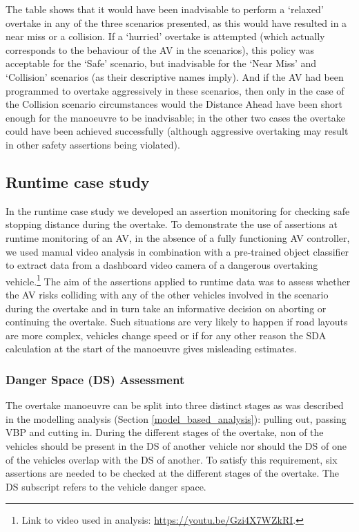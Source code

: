 The table shows that it would have been inadvisable to perform a `relaxed' overtake in any of the three scenarios presented, as this would have resulted in a near miss or a collision. If a `hurried' overtake is attempted (which actually corresponds to the behaviour of the AV in the scenarios), this policy was acceptable for the `Safe' scenario, but inadvisable for the `Near Miss' and `Collision' scenarios (as their descriptive names imply). And if the AV had been programmed to overtake aggressively in these scenarios, then only in the case of the Collision scenario circumstances would the Distance Ahead have been short enough for the manoeuvre to be inadvisable; in the other two cases the overtake could have been achieved successfully (although aggressive overtaking may result in other safety assertions being violated).

\subsection{Runtime case study}
In the runtime case study we developed an assertion monitoring for checking safe stopping distance during the overtake. 
%
To demonstrate the use of assertions at runtime monitoring of an AV, in the absence of a fully functioning AV controller, we used manual video analysis in combination with a pre-trained object classifier to extract data from a dashboard video camera of a dangerous overtaking vehicle.\footnote{Link to video used in analysis: \url{https://youtu.be/Gzi4X7WZkRI}.} 
%
The aim of the assertions applied to runtime data was to assess whether the AV risks colliding with any of the other vehicles involved in the scenario during the overtake and in turn take an informative decision on aborting or continuing the overtake. 
%
Such situations are very likely to happen if road layouts are more complex, vehicles change speed or if for any other reason the SDA calculation at the start of the manoeuvre gives misleading estimates. 

\subsubsection{Danger Space (DS) Assessment}
\label{DS_assessment}

The overtake manoeuvre can be split into three distinct stages as was described in the modelling analysis (Section \ref{model_based_analysis}): pulling out, passing VBP and cutting in.
%
During the different stages of the overtake, non of the vehicles should be present in the DS of another vehicle nor should the DS of one of the vehicles overlap with the DS of another. 
%
To satisfy this requirement, six assertions are needed to be checked at the different stages of the overtake.
%
The DS subscript refers to the vehicle danger space.

